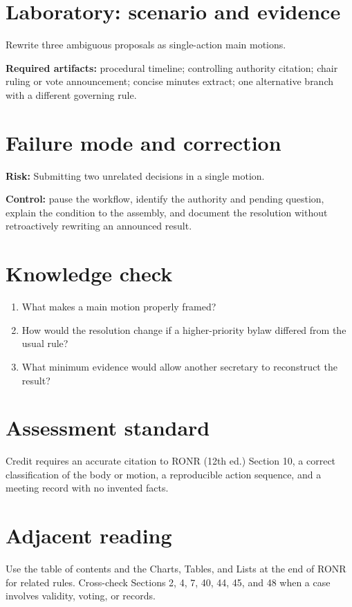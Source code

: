 \documentclass[11pt]{article}
\begin{document}
\section{Laboratory: scenario and evidence}
Rewrite three ambiguous proposals as single-action main motions.

\textbf{Required artifacts:} procedural timeline; controlling authority citation; chair ruling or vote announcement; concise minutes extract; one alternative branch with a different governing rule.

\section{Failure mode and correction}
\textbf{Risk:} Submitting two unrelated decisions in a single motion.

\textbf{Control:} pause the workflow, identify the authority and pending question, explain the condition to the assembly, and document the resolution without retroactively rewriting an announced result.

\section{Knowledge check}
\begin{enumerate}[leftmargin=*,itemsep=4pt]
\item What makes a main motion properly framed?
\item How would the resolution change if a higher-priority bylaw differed from the usual rule?
\item What minimum evidence would allow another secretary to reconstruct the result?
\end{enumerate}

\section{Assessment standard}
Credit requires an accurate citation to RONR (12th ed.) Section 10, a correct classification of the body or motion, a reproducible action sequence, and a meeting record with no invented facts.

\section{Adjacent reading}
Use the table of contents and the Charts, Tables, and Lists at the end of RONR for related rules. Cross-check Sections 2, 4, 7, 40, 44, 45, and 48 when a case involves validity, voting, or records.
\end{document}
